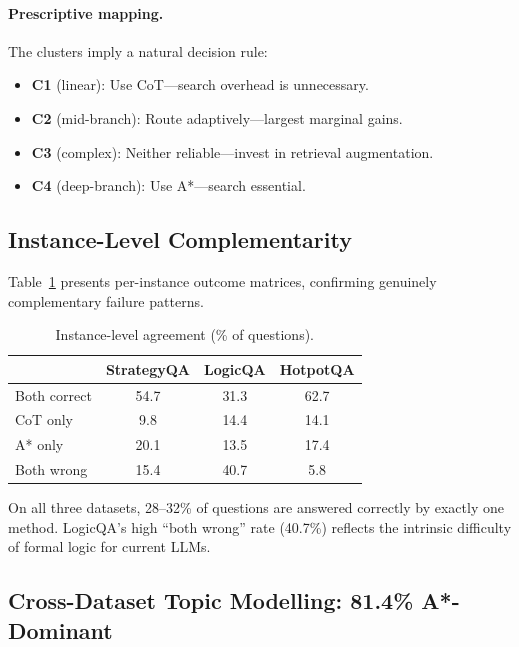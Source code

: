 \documentclass[11pt]{article}
\begin{document}
\paragraph{Prescriptive mapping.}
The clusters imply a natural decision rule:
\begin{itemize}[leftmargin=1.5em,itemsep=2pt]
\item \textbf{C1} (linear): Use CoT---search overhead is unnecessary.
\item \textbf{C2} (mid-branch): Route adaptively---largest marginal gains.
\item \textbf{C3} (complex): Neither reliable---invest in retrieval augmentation.
\item \textbf{C4} (deep-branch): Use A*---search essential.
\end{itemize}

\subsection{Instance-Level Complementarity}
\label{sec:complementarity}

Table~\ref{tab:complementarity} presents per-instance outcome matrices, confirming genuinely complementary failure patterns.

\begin{table}[t]
\centering
\caption{Instance-level agreement (\% of questions).}
\label{tab:complementarity}
\small
\begin{tabular}{@{}lccc@{}}
\toprule
& \textbf{StrategyQA} & \textbf{LogicQA} & \textbf{HotpotQA} \\
\midrule
Both correct & 54.7 & 31.3 & 62.7 \\
CoT only & 9.8 & 14.4 & 14.1 \\
A* only & 20.1 & 13.5 & 17.4 \\
Both wrong & 15.4 & 40.7 & 5.8 \\
\bottomrule
\end{tabular}
\end{table}

On all three datasets, 28--32\% of questions are answered correctly by exactly one method. LogicQA's high ``both wrong'' rate (40.7\%) reflects the intrinsic difficulty of formal logic for current LLMs.

\subsection{Cross-Dataset Topic Modelling: 81.4\% A*-Dominant}
\label{sec:topic}
\end{document}
